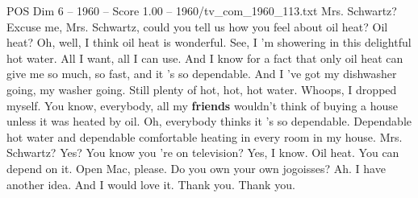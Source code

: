 \begin{textsample}{POS Dim 6 – 1960 – Score 1.00 – 1960/tv\_com\_1960\_113.txt}  \label{ex:f6_pos_030}
Mrs.
Schwartz?
Excuse me, Mrs.
Schwartz, could you tell us how you feel about oil heat?
Oil heat?
Oh, well, I think oil heat is wonderful.
See, I 'm showering in this delightful hot water.
All I want, all I can use.
And I know for a fact that only oil heat can give me so much, so fast, and it 's so dependable.
And I 've got my dishwasher going, my washer going.
Still plenty of hot, hot, hot water.
Whoops, I dropped myself.
You know, everybody, all my \textbf{friends} wouldn't think of buying a house unless it was heated by oil.
Oh, everybody thinks it 's so dependable.
Dependable hot water and dependable comfortable heating in every room in my house.
Mrs.
Schwartz?
Yes?
You know you 're on television?
Yes, I know.
Oil heat.
You can depend on it.
Open Mac, please.
Do you own your own jogoisses?
Ah.
I have another idea.
And I would love it.
Thank you.
Thank you.

\end{textsample}
